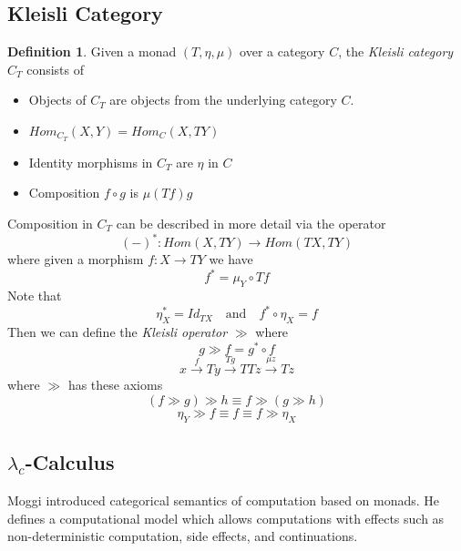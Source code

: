 \documentclass[a4paper,10pt]{article}
\theoremstyle{definition}
\newtheorem{definition}{Definition}[section]
\begin{document}
\subsection{Kleisli Category}
\begin{definition}
    Given a monad $(T,\eta,\mu)$ over a category $C$,
    the \textit{Kleisli category} $C_T$ consists of
    \begin{itemize}
        \item Objects of $C_T$ are objects from the underlying category $C$.
        \item $Hom_{C_T}(X,Y) = Hom_C (X,TY)$
        \item Identity morphisms in $C_T$ are $\eta$ in $C$
        \item Composition $f \circ g$ is $\mu(Tf)g$
    \end{itemize}
\end{definition}

Composition in $C_T$ can be described in more detail via the operator
\begin{equation}
    (-)^{*} : Hom(X, TY) \rightarrow Hom(TX, TY)
\end{equation}
where given a morphism $f: X \rightarrow TY$ we have
\begin{equation}
    f^{*} = \mu_{Y} \circ Tf
\end{equation}
Note that
\begin{equation}
    \eta_{X}^{*} = Id_{TX}
    \quad\textrm{and}\quad
    f^{*} \circ \eta _{X} = f
\end{equation}
Then we can define the \textit{Kleisli operator} $\gg$ where
\begin{equation}
    g \gg f = g^{*} \circ f
\end{equation}
\begin{equation}
    x
    \stackrel{f}{\rightarrow}     T y
    \stackrel{T g}{\rightarrow}   T T z
    \stackrel{\mu z}{\rightarrow} T z
\end{equation}
where $\gg$ has these axioms
\begin{equation}
    (f \gg g) \gg h \equiv f \gg (g \gg h)
\end{equation}
\begin{equation}
    \eta_Y \gg f \equiv f \equiv f \gg \eta_X
\end{equation}

\subsection{$\lambda_c$-Calculus}
Moggi \cite{moggi1989computational} introduced categorical semantics of computation
based on monads.
He defines a computational model which allows computations with effects such as non-deterministic 
computation, side effects, and continuations.
\end{document}
